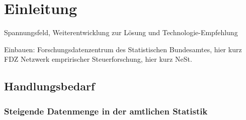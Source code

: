 \documentclass[
  german,
  10pt,
  twoside]{article}
\makeatletter
\newcommand{\berlintime}{%
  \berlinhr=\time\relax
  \divide\berlinhr by 60\relax
  \berlinmin=\time\relax
  \multiply\berlinhr by -60\relax
  \advance\berlinmin by \berlinhr\relax
  \berlinhr=\time\relax
  \divide\berlinhr by 60\relax
  \advance\berlinhr by 1\relax
  \ifnum\berlinhr>23\relax
    \advance\berlinhr by -24\relax
  \fi
  \ifnum\berlinhr<10 0\fi\the\berlinhr:\ifnum\berlinmin<10 0\fi\the\berlinmin%
}
\newif\ifdraftmode
\providecommand{\totalchars}{0}
\providecommand{\totalwords}{0}
\providecommand{\abstractchars}{0}
\providecommand{\abstractwords}{0}
\providecommand{\zusammenfassungchars}{0}
\providecommand{\zusammenfassungwords}{0}
\providecommand{\footnotecountnum}{0}
\providecommand{\citationcountnum}{0}
\newcommand{\doctitle}{$title$}
\newcommand{\docauthors}{$author-short$}
\newcommand{\docpublication}{$publication$}
\newcommand{\docpublicationissue}{$publication-issue$}
\newcommand{\metadatapage}{%
  \clearpage
  \thispagestyle{empty}
  \onecolumn
  \vspace*{1.5cm}
  
  {\raggedright
  {\LARGE\bfseries\color{wistaBlue} Dokument-Metadaten}\\[0.5cm]
  
  \begin{tabular}{@{}ll}
    \textbf{Titel:} & \doctitle \\[0.3em]
    \textbf{Autoren:} & \docauthors \\[0.3em]
    \textbf{Veröffentlichung:} & \docpublication\ \docpublicationissue \\[0.3em]
    \textbf{Erstellungsdatum:} & \today\ um \berlintime\ Uhr \\[0.3em]
  \end{tabular}
  
  \vspace{0.5cm}
  {\color{wistaBlue}\rule{\textwidth}{1pt}}
  \par}
  
  \vspace{1cm}
  
  {\large\bfseries\color{wistaDarkGray} Dokumentstatistik}\\[0.5cm]
  
  \small
  \begin{tabular}{@{}lrrrrrr@{}}
    \toprule
    \textbf{Abschnitt} & \textbf{Wörter} & \textbf{Zeichen} & \textbf{Fußn.} & \textbf{Quellen} & \textbf{Vorgabe} \\
    \midrule
    Insgesamt & \textcolor{wistaBlue}{\textbf{\totalwords}} & \textcolor{wistaBlue}{\textbf{\totalchars}} & \textcolor{wistaBlue}{\textbf{\footnotecountnum}} & \textcolor{wistaBlue}{\textbf{\citationcountnum}} & 30\,000 Z. \\
    Zusammenfassung & \textcolor{wistaBlue}{\textbf{\zusammenfassungwords}} & \textcolor{wistaBlue}{\textbf{\zusammenfassungchars}} & --- & --- & 800 Z. \\
    Abstract & \textcolor{wistaBlue}{\textbf{\abstractwords}} & \textcolor{wistaBlue}{\textbf{\abstractchars}} & --- & --- & 700 Z. \\
    \midrule
    \sectionrows
    \bottomrule
  \end{tabular}
  \normalsize
  
  \vspace{0.5cm}
  
  {\large\bfseries\color{wistaDarkGray} Schlüsselwörter}\\[0.3cm]
  \small
  \schlusselworterlist
  \normalsize
  
  \vspace{0.5cm}
  
  {\large\bfseries\color{wistaDarkGray} Keywords}\\[0.3cm]
  \small
  \keywordslist
  \normalsize
  
  \vspace{1cm}
  
  {\large\bfseries\color{wistaDarkGray} Tabellen}\\[0.3cm]
  
  \small
  \begin{tabular}{@{}lp{12cm}@{}}
    \toprule
    \textbf{Nr.} & \textbf{Beschreibung} \\
    \midrule
    \tablerows
    \bottomrule
  \end{tabular}
  \normalsize
  
  \vspace{1cm}
  
  {\large\bfseries\color{wistaDarkGray} Abbildungen}\\[0.3cm]
  
  \small
  \begin{tabular}{@{}lp{12cm}@{}}
    \toprule
    \textbf{Nr.} & \textbf{Beschreibung} \\
    \midrule
    \figurerows
    \bottomrule
  \end{tabular}
  \normalsize
  
  \clearpage
}
\makeatother
\begin{document}
\newcommand{\tablerows}{            \hyperref[tbl-pkg-versions]{Tabelle~1} & Versionen verfügbarer R-Packages \\
            \hyperref[tbl-baseline]{Tabelle~2} & Baselines in SAS und Stata (anhand 1\% des simuliertes BTP) \\
            \hyperref[tbl-benchmark-small]{Tabelle~3} & Performanz Messungen für die Fallzahlberechnung anhand 1\% des BTP \\
            \hyperref[tbl-benchmark-regr-small]{Tabelle~4} & Performanz Messungen für die Regressionsberechnung anhand 1\% des BTP \\
            \hyperref[tbl-benchmark]{Tabelle~5} & Performanz Messungen für die Fallzahlberechnung anhand 10\% des BTP \\
            \hyperref[tbl-benchmark-regr]{Tabelle~6} & Performanz Messungen für die Regressionsberechnung anhand 10\% des BTP \\
            \hyperref[tbl-bm-cnt-small]{Tabelle~7} & Benchmarkergebnisse für Fallzahlen (kleine Stichproben des BTP) \\
            \hyperref[tbl-bm-reg-small]{Tabelle~8} & Benchmarkergebnisse für Regression (kleine Stichproben des BTP) \\
}
\newcommand{\figurerows}{            \hyperref[fig-optimization-strategies]{Abbildung~1} & Strategien zur Performanz-Optimierung im FDZ-Bund \\
}
\newcommand{\schlusselworterlist}{}
\newcommand{\keywordslist}{}
\ifdraftmode
\metadatapage
\fi

\section{Einleitung}\label{sec-einleitung}

Spannungsfeld, Weiterentwicklung zur Lösung und Technologie-Empfehlung

Einbauen: Forschungsdatenzentrum des Statistischen Bundesamtes, hier kurz
FDZ Netzwerk empririscher Steuerforschung, hier kurz NeSt.

\subsection{Handlungsbedarf}\label{handlungsbedarf}

\subsubsection{Steigende Datenmenge in der amtlichen
Statistik}\label{steigende-datenmenge-in-der-amtlichen-statistik}
\end{document}
